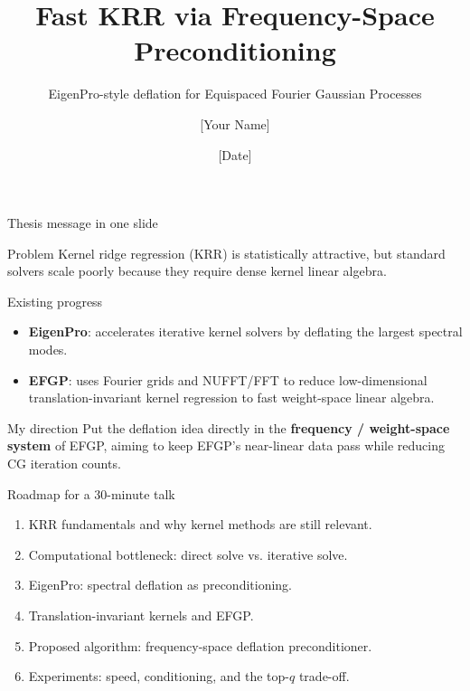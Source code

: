 \documentclass[aspectratio=169,10pt]{beamer}
\title{Fast KRR via Frequency-Space Preconditioning}
\subtitle{EigenPro-style deflation for Equispaced Fourier Gaussian Processes}
\author{[Your Name]}
\institute{Final Thesis Presentation}
\date{[Date]}
\begin{document}
\begin{frame}
  \titlepage
\end{frame}

\begin{frame}{Thesis message in one slide}
\begin{block}{Problem}
Kernel ridge regression (KRR) is statistically attractive, but standard solvers scale poorly because they require dense kernel linear algebra.
\end{block}

\begin{block}{Existing progress}
\begin{itemize}
  \item \textbf{EigenPro}: accelerates iterative kernel solvers by deflating the largest spectral modes.
  \item \textbf{EFGP}: uses Fourier grids and NUFFT/FFT to reduce low-dimensional translation-invariant kernel regression to fast weight-space linear algebra.
\end{itemize}
\end{block}

\begin{block}{My direction}
Put the deflation idea directly in the \textbf{frequency / weight-space system} of EFGP, aiming to keep EFGP's near-linear data pass while reducing CG iteration counts.
\end{block}
\end{frame}

\begin{frame}{Roadmap for a 30-minute talk}
\begin{enumerate}
  \item KRR fundamentals and why kernel methods are still relevant.
  \item Computational bottleneck: direct solve vs. iterative solve.
  \item EigenPro: spectral deflation as preconditioning.
  \item Translation-invariant kernels and EFGP.
  \item Proposed algorithm: frequency-space deflation preconditioner.
  \item Experiments: speed, conditioning, and the top-$q$ trade-off.
\end{enumerate}
\end{frame}
\end{document}
